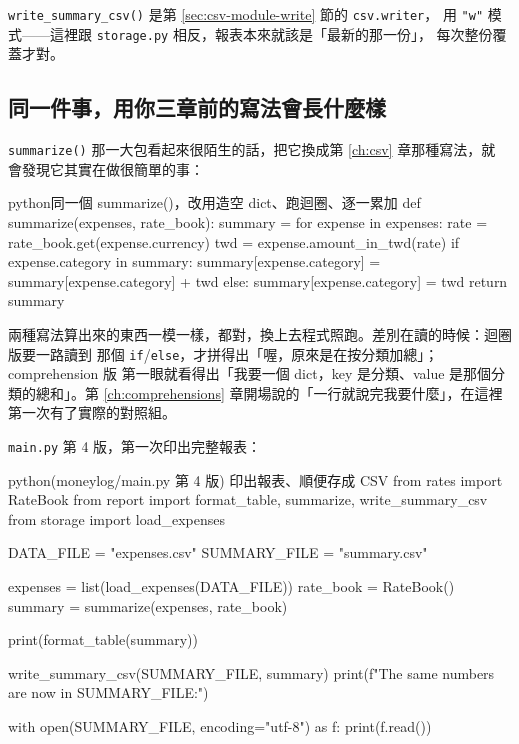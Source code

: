 \texttt{write\_summary\_csv()} 是第 \ref{sec:csv-module-write} 節的 \texttt{csv.writer}，
用 \texttt{"w"} 模式——這裡跟 \texttt{storage.py} 相反，報表本來就該是「最新的那一份」，
每次整份覆蓋才對。

\subsection*{同一件事，用你三章前的寫法會長什麼樣}

\texttt{summarize()} 那一大包看起來很陌生的話，把它換成第 \ref{ch:csv} 章那種寫法，就
會發現它其實在做很簡單的事：

\begin{code}{python}{同一個 summarize()，改用造空 dict、跑迴圈、逐一累加}
def summarize(expenses, rate_book):
    summary = {}
    for expense in expenses:
        rate = rate_book.get(expense.currency)
        twd = expense.amount_in_twd(rate)
        if expense.category in summary:
            summary[expense.category] = summary[expense.category] + twd
        else:
            summary[expense.category] = twd
    return summary
\end{code}

兩種寫法算出來的東西一模一樣，都對，換上去程式照跑。差別在讀的時候：迴圈版要一路讀到
那個 \texttt{if}/\texttt{else}，才拼得出「喔，原來是在按分類加總」；comprehension 版
第一眼就看得出「我要一個 dict，key 是分類、value 是那個分類的總和」。第
\ref{ch:comprehensions} 章開場說的「一行就說完我要什麼」，在這裡第一次有了實際的對照組。


\texttt{main.py} 第 4 版，第一次印出完整報表：

\begin{example}{python}{(moneylog/main.py 第 4 版) 印出報表、順便存成 CSV}
from rates import RateBook
from report import format_table, summarize, write_summary_csv
from storage import load_expenses

DATA_FILE = "expenses.csv"
SUMMARY_FILE = "summary.csv"

expenses = list(load_expenses(DATA_FILE))
rate_book = RateBook()
summary = summarize(expenses, rate_book)

print(format_table(summary))

write_summary_csv(SUMMARY_FILE, summary)
print(f"The same numbers are now in {SUMMARY_FILE}:")

with open(SUMMARY_FILE, encoding="utf-8") as f:
    print(f.read())
\end{example}

